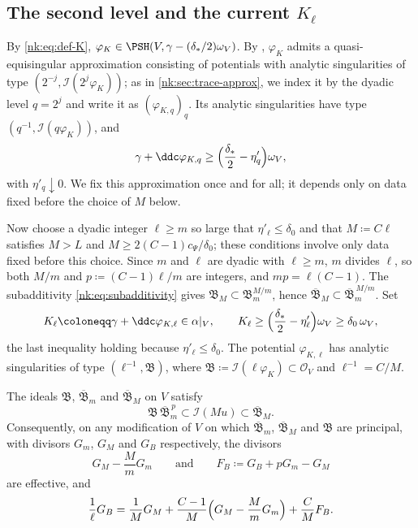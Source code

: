 \subsection{The second level and the current \texorpdfstring{$K_\ell$}{K\_l}}

By \eqref{nk:eq:def-K}, $\varphi_K\in\PSH(V,\gamma-(\delta_*/2)\omega_V)$.
By \cite[Theorem~1.6.2]{SGPT}, $\varphi_K$ admits a
quasi-equisingular approximation consisting of potentials with analytic
singularities of type $(2^{-j},\mathcal I(2^j\varphi_K))$; as in
\cref{nk:sec:trace-approx}, we index it by the dyadic level $q=2^j$ and
write it as $(\varphi_{K,q})_q$. Its analytic singularities have type
$(q^{-1},\mathcal I(q\varphi_K))$, and
\[
  \gamma+\ddc \varphi_{K,q}\ge\Bigl(\frac{\delta_*}2-\eta'_q\Bigr)\omega_V,
\]
with $\eta'_q\downarrow 0$. We fix
this approximation once and for all; it depends only on data fixed
before the choice of $M$ below.

Now choose a dyadic integer $\ell\ge m$ so large that
$\eta'_\ell\le\delta_0$ and that $M\coloneqq C\ell$ satisfies $M>L$ and
$M\ge2(C-1)c_\Psi/\delta_0$; these conditions involve only data fixed
before this choice. Since $m$ and $\ell$ are dyadic with
$\ell\ge m$, $m$ divides $\ell$, so both $M/m$ and
$p\coloneqq (C-1)\ell/m$ are integers, and $mp=\ell(C-1)$. The
subadditivity \eqref{nk:eq:subadditivity} gives
$\mathfrak B_M\subset\mathfrak B_m^{M/m}$, hence
$\overline{\mathfrak B}_M\subset\overline{\mathfrak B}_m^{\,M/m}$. Set
\begin{equation}\label{nk:eq:def-K-ell}
  K_\ell\coloneqq \gamma+\ddc\varphi_{K,\ell}\in\alpha|_V,\qquad
  K_\ell\ge\Bigl(\frac{\delta_*}2-\eta'_\ell\Bigr)\omega_V
  \ge\delta_0\,\omega_V,
\end{equation}
the last inequality holding because $\eta'_\ell\le\delta_0$. The
potential $\varphi_{K,\ell}$ has analytic singularities of type
$(\ell^{-1},\mathfrak B)$, where $\mathfrak B\coloneqq \mathcal I(\ell\varphi_K)\subset\mathcal O_V$ and
$\ell^{-1}=C/M$.

\begin{lemma}\label{nk:lem:ideal-comparison}
The ideals $\mathfrak B$, $\overline{\mathfrak B}_m$ and $\overline{\mathfrak B}_M$ on $V$ satisfy
\begin{equation}\label{nk:eq:ideal-comparison}
  \mathfrak B\,\overline{\mathfrak B}_m^{\,p}\subset\mathcal I(Mu)\subset\overline{\mathfrak B}_M .
\end{equation}
Consequently, on any modification of $V$ on which $\overline{\mathfrak B}_m$,
$\overline{\mathfrak B}_M$ and $\mathfrak B$ are principal, with divisors $G_m$, $G_M$
and $G_B$ respectively, the divisors
\[
  G_M-\frac MmG_m\qquad\text{and}\qquad F_B\coloneqq G_B+pG_m-G_M
\]
are effective, and
\begin{equation}\label{nk:eq:GB-decomposition}
  \frac1\ell G_B=\frac1MG_M+\frac{C-1}M\Bigl(G_M-\frac MmG_m\Bigr)
     +\frac CMF_B .
\end{equation}
\end{lemma}

